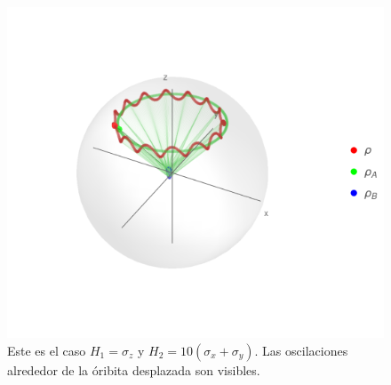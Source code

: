 \begin{figure}[h!]
    \centering
    \includegraphics[width=0.6\linewidth]{maxent/figures/U1xU2_H1=sz_H2=10*(sx+sy)_z=0.9_p=0.85_sequence.png}
    \caption{Este es el caso $H_{1}=\sigma_{z}$ y $H_{2}=10(\sigma_{x}+\sigma_{y})$. Las oscilaciones alrededor de la óribita desplazada son visibles.}
    \label{fig:SmallP3}
\end{figure}


\newpage